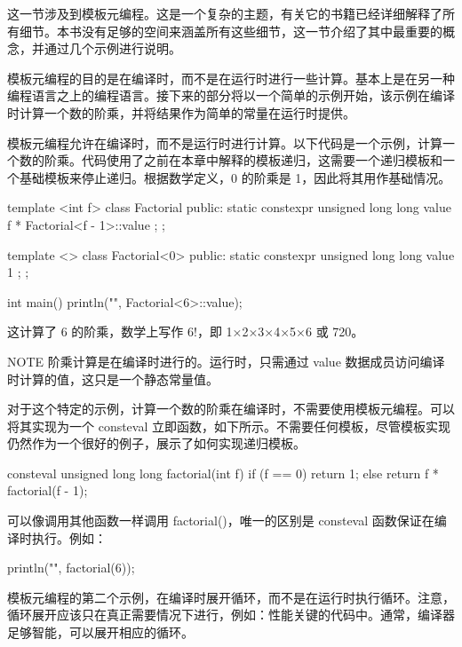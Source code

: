 
这一节涉及到模板元编程。这是一个复杂的主题，有关它的书籍已经详细解释了所有细节。本书没有足够的空间来涵盖所有这些细节，这一节介绍了其中最重要的概念，并通过几个示例进行说明。

模板元编程的目的是在编译时，而不是在运行时进行一些计算。基本上是在另一种编程语言之上的编程语言。接下来的部分将以一个简单的示例开始，该示例在编译时计算一个数的阶乘，并将结果作为简单的常量在运行时提供。


模板元编程允许在编译时，而不是运行时进行计算。以下代码是一个示例，计算一个数的阶乘。代码使用了之前在本章中解释的模板递归，这需要一个递归模板和一个基础模板来停止递归。根据数学定义，0 的阶乘是 1，因此将其用作基础情况。

\begin{cpp}
template <int f>
class Factorial
{
    public:
    static constexpr unsigned long long value { f * Factorial<f - 1>::value };
};

template <>
class Factorial<0>
{
    public:
    static constexpr unsigned long long value { 1 };
};

int main()
{
    println("{}", Factorial<6>::value);
}
\end{cpp}

这计算了 6 的阶乘，数学上写作 6!，即 1×2×3×4×5×6 或 720。

\begin{myNotic}{NOTE}
阶乘计算是在编译时进行的。运行时，只需通过 value 数据成员访问编译时计算的值，这只是一个静态常量值。
\end{myNotic}

对于这个特定的示例，计算一个数的阶乘在编译时，不需要使用模板元编程。可以将其实现为一个 consteval 立即函数，如下所示。不需要任何模板，尽管模板实现仍然作为一个很好的例子，展示了如何实现递归模板。

\begin{cpp}
consteval unsigned long long factorial(int f)
{
    if (f == 0) { return 1; }
    else { return f * factorial(f - 1); }
}
\end{cpp}

可以像调用其他函数一样调用 factorial()，唯一的区别是 consteval 函数保证在编译时执行。例如：

\begin{cpp}
println("{}", factorial(6));
\end{cpp}


模板元编程的第二个示例，在编译时展开循环，而不是在运行时执行循环。注意，循环展开应该只在真正需要情况下进行，例如：性能关键的代码中。通常，编译器足够智能，可以展开相应的循环。

